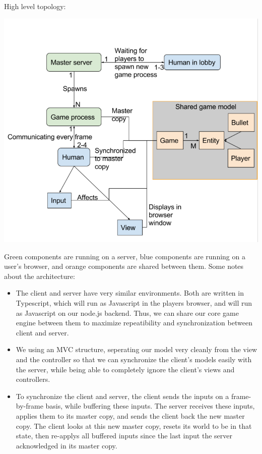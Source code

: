 \documentclass[11pt, oneside]{article}   	%
\begin{document}
High level topology:\\
\begin{center}
\includegraphics[scale=0.7]{images/architecture.png}
\end{center}
Green components are running on a server, blue components are running on a user's browser, and orange components are shared between them. Some notes about the architecture:
\begin{itemize}
  \item The client and server have very similar environments.
Both are written in Typescript, which will run as Javascript in the players browser, and will run as Javascript on our node.js backend.
Thus, we can share our core game engine between them to maximize repeatibility and synchronization between client and server.
  \item We using an MVC structure, seperating our model very cleanly from the
view and the controller so that we can synchronize the client's models easily
with the server, while being able to completely ignore the client's views and controllers.
  \item To synchronize the client and server, the client sends the inputs on a frame-by-frame basis, while buffering these inputs.
The server receives these inputs, applies them to its master copy, and sends the client back the new master copy.
The client looks at this new master copy, resets its world to be in that state, then re-applys all buffered inputs since the last input the server acknowledged in its master copy.
\end{itemize}
\end{document}

